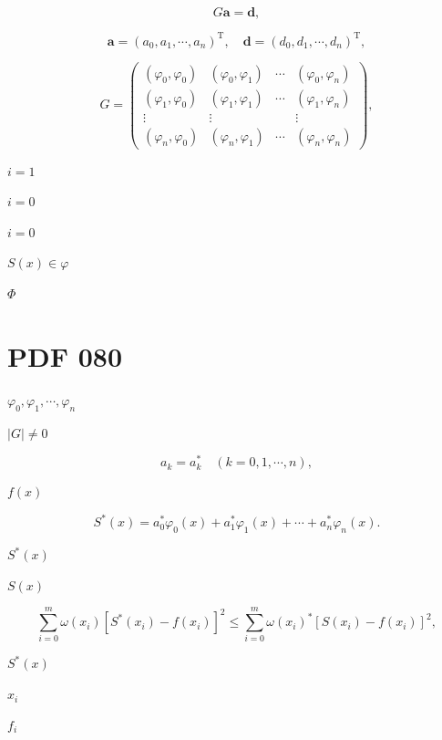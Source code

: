 \documentclass[UTF8,fontset=fandol,a4paper]{ctexart}
\begin{document}
\[
G\boldsymbol a=\boldsymbol d,
\]

\[
\boldsymbol a=(a_0,a_1,\cdots,a_n)^{\mathrm T},\quad\boldsymbol d=(d_0,d_1,\cdots,d_n)^{\mathrm T},
\]

\[
G=\begin{pmatrix}
(\varphi_0,\varphi_0)&(\varphi_0,\varphi_1)&\cdots&(\varphi_0,\varphi_n)\\
(\varphi_1,\varphi_0)&(\varphi_1,\varphi_1)&\cdots&(\varphi_1,\varphi_n)\\
\vdots&\vdots&&\vdots\\
(\varphi_n,\varphi_0)&(\varphi_n,\varphi_1)&\cdots&(\varphi_n,\varphi_n)
\end{pmatrix},\tag{3.6.7}
\]

\noindent $i=1$\par

\noindent $i=0$\par

\noindent $i=0$\par

\noindent $S(x)\in\varphi$\par

\noindent $\Phi$\par

\section*{PDF 080}

\noindent $\varphi_0,\varphi_1,\cdots,\varphi_n$\par

\noindent $|G|\ne0$\par

\[
a_k=a_k^*\quad(k=0,1,\cdots,n),
\]

\noindent $f(x)$\par

\[
S^*(x)=a_0^*\varphi_0(x)+a_1^*\varphi_1(x)+\cdots+a_n^*\varphi_n(x).
\]

\noindent $S^*(x)$\par

\noindent $S(x)$\par

\[
\sum_{i=0}^m\omega(x_i)[S^*(x_i)-f(x_i)]^2\leqslant\sum_{i=0}^m\omega(x_i)^*[S(x_i)-f(x_i)]^2,
\]

\noindent $S^*(x)$\par

\noindent $x_i$\par

\noindent $f_i$\par
\end{document}

